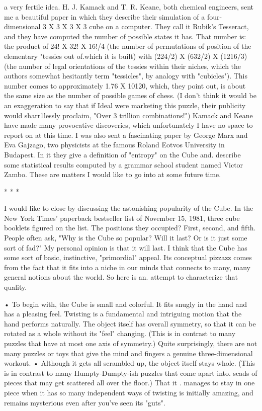 a very fertile idea. H. J. Kamack and T. R. Keane, both chemical engineers, sent
me a beautiful paper in which they describe their simulation of a four-dimensional
3 X 3 X 3 X 3 cube on a computer. They call it Rubik's Tesseract, and they have
computed the number of possible states it has. That number is: the product of 24!
X 32! X 16!/4 (the number of permutations of position of the elementary "tessies
out of.which it is built) with (224/2) X (632/2) X (1216/3) (the number of legal
orientations of the tessies within their niches, which the authors somewhat
hesitantly term "tessicles", by analogy with "cubicles"). This number comes to
approximately 1.76 X 10120, which, they point out, is about the same size as the
number of possible games of chess. (I don't think it would be an exaggeration to
say that if Ideal were marketing this puzzle, their publicity would sharr1lessly
proclaim, "Over 3 trillion combinations!") Kamack and Keane have made many
provocative discoveries, which unfortunately I have no space to report on at this
time. I was also sent a fascinating paper by George Marx and Eva Gajzago, two
physicists at the famous Roland Eotvos University in Budapest. In it they give a
definition of "entropy" on the Cube and. describe some statistical results computed
by a grammar school student named Victor Zambo. These are matters I would like
to go into at some future time.

                                      *   *   *

        I would like to close by discussing the astonishing popularity of the Cube.
In the New York Times' paperback bestseller list of November 15, 1981, three
cube booklets figured on the list. The positions they occupied? First, second, and
fifth. People often ask, "Why is the Cube so popular? Will it last? Or is it just some
sort of fad?" My personal opinion is that it will last. I think that the Cube has some
sort of basic, instinctive, "primordial" appeal. Its conceptual pizzazz comes from
the fact that it fits into a niche in our minds that connects to many, many general
notions about the world. So here is an. attempt to characterize that quality.

        • To begin with, the Cube is small and colorful. It fits snugly in the hand
and has a pleasing feel. Twisting is a fundamental and intriguing motion that the
hand performs naturally. The object itself has overall symmetry, so that it can be
rotated as a whole without its "feel" changing. (This is in contrast to many puzzles
that have at most one axis of symmetry.) Quite surprisingly, there are not many
puzzles or toys that give the mind and fingers a genuine three-dimensional
workout.
        • Although it gets all scrambled up, the object itself stays whole. (This is in
contrast to many Humpty-Dumpty-ish puzzles that come apart into. scads of pieces
that may get scattered all over the floor.) That it . manages to stay in one piece
when it has so many independent ways of twisting is initially amazing, and
remains mysterious even after you've seen its "guts".




